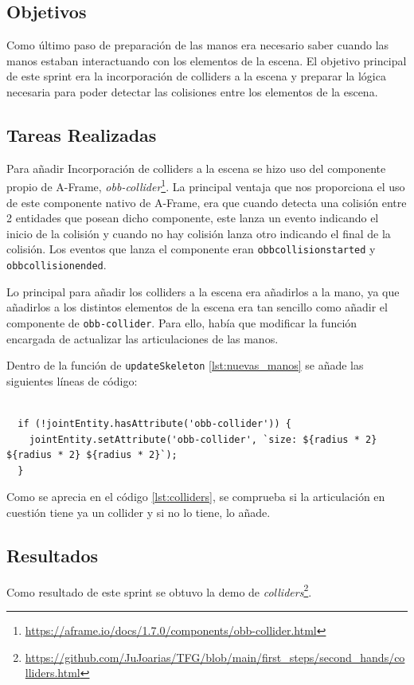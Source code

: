 \documentclass[a4paper, 12pt]{book}
\begin{document}
\subsection{Objetivos}
\label{subsec:objetivo-principal4}
Como último paso de preparación de las manos era necesario saber cuando las manos estaban interactuando con los elementos de la escena. El objetivo principal de este sprint era la incorporación de colliders  
a la escena y preparar la lógica necesaria para poder detectar las colisiones entre los elementos de la escena. 

\subsection{Tareas Realizadas}
\label{subsec:implementacion4}
Para añadir Incorporación de colliders  
a la escena se hizo uso del componente propio de A-Frame, \textit{obb-collider}\footnote{\url{https://aframe.io/docs/1.7.0/components/obb-collider.html}}.
La principal ventaja que nos proporciona el uso de este componente nativo de A-Frame, era que cuando detecta una colisión entre 2 entidades que posean dicho componente, este lanza un evento indicando el inicio de la colisión y cuando no hay colisión lanza otro indicando el final de la colisión.
Los eventos que lanza el componente eran \texttt{obbcollisionstarted} y \texttt{obbcollisionended}.

Lo principal para añadir los colliders a la escena 
era añadirlos a la mano, ya que añadirlos a los distintos elementos de la escena era tan sencillo como añadir el componente de \texttt{obb-collider}. Para ello,
había que modificar la función encargada de actualizar las articulaciones de las manos. 

Dentro de la función de \texttt{updateSkeleton} \ref{lst:nuevas_manos} se añade las siguientes líneas de código:

\begin{lstlisting}[caption=Añadir Incorporación de colliders a la mano, captionpos=b, label=lst:colliders]
  
  if (!jointEntity.hasAttribute('obb-collider')) {
    jointEntity.setAttribute('obb-collider', `size: ${radius * 2} ${radius * 2} ${radius * 2}`);
  }
\end{lstlisting}

Como se aprecia en el código \ref{lst:colliders}, se comprueba si la articulación en cuestión tiene ya un collider y si no lo tiene, lo añade.

\subsection{Resultados}
\label{subsec:resultados4}
Como resultado de este sprint se obtuvo la demo de \textit{colliders}\footnote{\url{https://github.com/JuJoarias/TFG/blob/main/first_steps/second_hands/colliders.html}}. 
\end{document}
